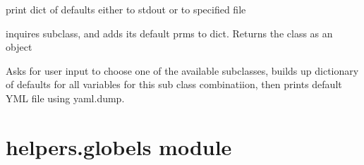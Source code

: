\documentclass[letterpaper,10pt,english]{sphinxmanual}
\begin{document}
\begin{fulllineitems}
\begin{fulllineitems}
\label{\detokenize{helpers:helpers.default_yml.DefaultFile.print_}}
print dict of defaults either to stdout or to specified file

\end{fulllineitems}


\begin{fulllineitems}
\label{\detokenize{helpers:helpers.default_yml.DefaultFile.process_subclass}}
inquires subclass, and adds its default prms to dict. 
Returns the class as an object

\end{fulllineitems}


\end{fulllineitems}


\begin{fulllineitems}
\label{\detokenize{helpers:helpers.default_yml.print_default_yml_file}}
Asks for user input to choose one of the available subclasses,
builds up dictionary of defaults for all variables for this sub
class combinatiion, then prints default YML file using yaml.dump.

\end{fulllineitems}



\section{helpers.globels module}
\label{\detokenize{helpers:module-helpers.globels}}\label{\detokenize{helpers:helpers-globels-module}}

\begin{fulllineitems}
\label{\detokenize{helpers:helpers.globels.archive}}
\end{fulllineitems}
\end{document}
